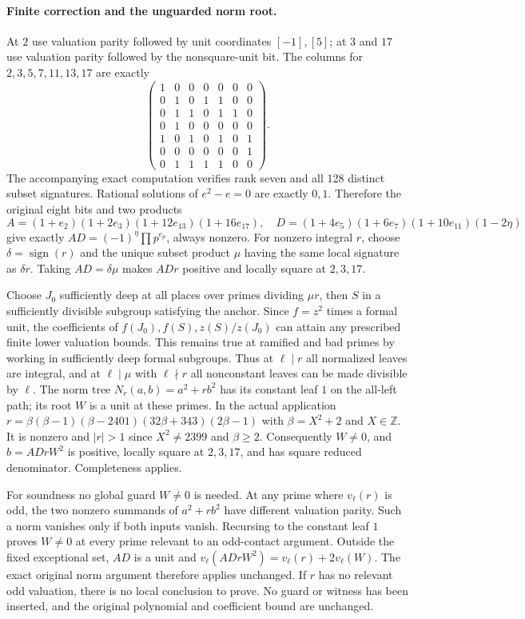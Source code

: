 \documentclass[11pt]{article}
\theoremstyle{definition}
\theoremstyle{remark}
\begin{document}
\paragraph{Finite correction and the unguarded norm root.}
At $2$ use valuation parity followed by unit coordinates $[-1],[5]$;
at $3$ and $17$ use valuation parity followed by the nonsquare-unit bit.
The columns for $2,3,5,7,11,13,17$ are exactly
\[
\begin{pmatrix}
1&0&0&0&0&0&0\\0&1&0&1&1&0&0\\0&1&1&0&1&1&0\\
0&1&0&0&0&0&0\\1&0&1&0&1&0&1\\0&0&0&0&0&0&1\\
0&1&1&1&1&0&0
\end{pmatrix}.
\]
The accompanying exact computation verifies rank seven and all 128
distinct subset signatures. Rational solutions of $e^2-e=0$ are
exactly $0,1$. Therefore the original eight bits and two products
\[
 A=(1+e_2)(1+2e_3)(1+12e_{13})(1+16e_{17}),\quad
 D=(1+4e_5)(1+6e_7)(1+10e_{11})(1-2\eta)
\]
give exactly $AD=(-1)^\eta\prod p^{e_p}$, always nonzero.
For nonzero integral $r$, choose $\delta=\operatorname{sign}(r)$
and the unique subset product $\mu$ having the same local signature
as $\delta r$. Taking $AD=\delta\mu$ makes $ADr$ positive and
locally square at $2,3,17$.

Choose $J_0$ sufficiently deep at all places over primes dividing
$\mu r$, then $S$ in a sufficiently divisible subgroup satisfying
the anchor. Since $f=z^2$ times a formal unit, the coefficients of
$f(J_0),f(S),z(S)/z(J_0)$ can attain any prescribed finite lower
valuation bounds. This remains true at ramified and bad primes by
working in sufficiently deep formal subgroups. Thus at $\ell\mid r$
all normalized leaves are integral, and at $\ell\mid\mu$ with
$\ell\nmid r$ all nonconstant leaves can be made divisible by $\ell$.
The norm tree $N_r(a,b)=a^2+rb^2$ has its constant leaf $1$ on
the all-left path; its root $W$ is a unit at these primes.
In the actual application $r=\beta(\beta-1)(\beta-2401)
(32\beta+343)(2\beta-1)$ with $\beta=X^2+2$ and $X\in\mathbb Z$.
It is nonzero and $|r|>1$ since $X^2\ne2399$ and $\beta\ge2$.
Consequently $W\ne0$, and $b=ADrW^2$ is positive, locally square
at $2,3,17$, and has square reduced denominator. Completeness applies.

For soundness no global guard $W\ne0$ is needed. At any prime where
$v_\ell(r)$ is odd, the two nonzero summands of $a^2+rb^2$ have
different valuation parity. Such a norm vanishes only if both inputs
vanish. Recursing to the constant leaf $1$ proves $W\ne0$ at every
prime relevant to an odd-contact argument. Outside the fixed
exceptional set, $AD$ is a unit and
$v_\ell(ADrW^2)=v_\ell(r)+2v_\ell(W)$.
The exact original norm argument therefore applies unchanged. If
$r$ has no relevant odd valuation, there is no local conclusion to
prove. No guard or witness has been inserted, and the original
polynomial and coefficient bound are unchanged.
\end{document}
